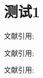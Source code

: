 \documentclass{ctexart}
\begin{document}
\tableofcontents

\section{测试1}

文献引用\cite{CHEN20092657}; 

文献引用\cite{CHEN20092657,Tang2023,Yin2021}; 

文献引用\cite{CHEN20092657,Tang2023,ZHU2023119062};

\newpage

\end{document}
